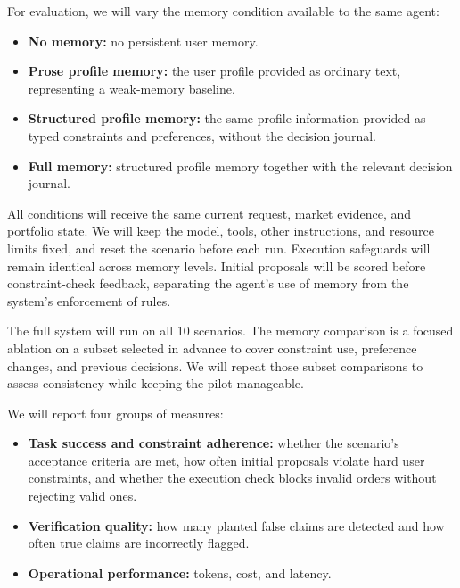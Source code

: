 \documentclass{article}
\begin{document}
For evaluation, we will vary the memory condition available to the same agent:

\begin{itemize}
  \item \textbf{No memory:} no persistent user memory.
  \item \textbf{Prose profile memory:} the user profile provided as ordinary text, representing a
        weak-memory baseline.
  \item \textbf{Structured profile memory:} the same profile information provided as typed
        constraints and preferences, without the decision journal.
  \item \textbf{Full memory:} structured profile memory together with the relevant decision journal.
\end{itemize}

All conditions will receive the same current request, market evidence, and portfolio state.
We will keep the model, tools, other instructions, and resource limits fixed, and reset the
scenario before each run. Execution safeguards will remain identical across memory levels.
Initial proposals will be scored before constraint-check feedback, separating the agent's use
of memory from the system's enforcement of rules.

The full system will run on all 10 scenarios. The memory comparison is a focused ablation on a
subset selected in advance to cover constraint use, preference changes, and previous decisions.
We will repeat those subset comparisons to assess consistency while keeping the pilot manageable.

We will report four groups of measures:

\begin{itemize}
  \item \textbf{Task success and constraint adherence:} whether the scenario's acceptance
      criteria are met, how often initial proposals violate hard user constraints, and whether
        the execution check blocks invalid orders without rejecting valid ones.
  \item \textbf{Verification quality:} how many planted false claims are detected and how
        often true claims are incorrectly flagged.
      \item \textbf{Operational performance:} tokens, cost, and latency.
\end{itemize}
\end{document}
